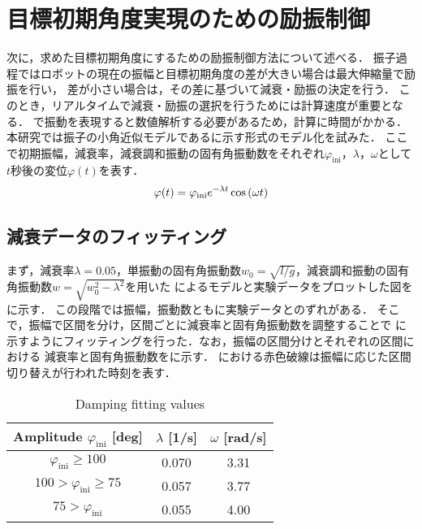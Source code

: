           \section{目標初期角度実現のための励振制御}
          次に，求めた目標初期角度にするための励振制御方法について述べる．
          振子過程ではロボットの現在の振幅と目標初期角度の差が大きい場合は最大伸縮量で励振を行い，
          差が小さい場合は，その差に基づいて減衰・励振の決定を行う．
          このとき，リアルタイムで減衰・励振の選択を行うためには計算速度が重要となる．
          で振動を表現すると数値解析する必要があるため，計算に時間がかかる．
          本研究では振子の小角近似モデルであるに示す形式のモデル化を試みた．
          ここで初期振幅，減衰率，減衰調和振動の固有角振動数をそれぞれ$\varphi_{\mathrm{ini}}$，$\lambda$，$\omega$として
          $t$秒後の変位$\varphi(t)$を表す．
          \begin{eqnarray}
            \equlabel{Approximation Model}
            \varphi(t)=\varphi_{\mathrm{ini}}e^{-\lambda t}\cos{(\omega t)}
          \end{eqnarray}
          \subsection{減衰データのフィッティング}
            まず，減衰率$\lambda=0.05$，単振動の固有角振動数$w_0=\sqrt{l/g}$，減衰調和振動の固有角振動数$w=\sqrt{w_{0}^2-\lambda^2}$を用いた
            によるモデルと実験データをプロットした図を\figref{}に示す．
            この段階では振幅，振動数ともに実験データとのずれがある．
            そこで，振幅で区間を分け，区間ごとに減衰率と固有角振動数を調整することで
            \figref{}に示すようにフィッティングを行った．なお，振幅の区間分けとそれぞれの区間における
            減衰率と固有角振動数をに示す．
            \figref{}における赤色破線は振幅に応じた区間切り替えが行われた時刻を表す．
            \begin{table}[tb]
              \begin{center}
                \caption{Damping fitting values}
                \vspace{2mm}
                \begin{tabular}{c|c|c}
                  \hline
                  Amplitude $\varphi_{\mathrm{ini}}$ [deg] & $\lambda$ [1/s] & $\omega$ [rad/s]\\
                  \hline
                  $\varphi_{\mathrm{ini}}\ge100$ & 0.070 & 3.31 \\
                  $100>\varphi_{\mathrm{ini}}\ge75$ & 0.057 & 3.77 \\
                  $75>\varphi_{\mathrm{ini}}$ & 0.055 & 4.00 \\                   
                  \hline
                \end{tabular}
              \end{center}
            \end{table}

